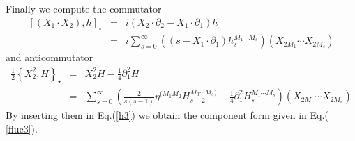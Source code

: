\documentclass[a4paper,12pt]{article}
\begin{document}
Finally we compute the commutator 
\begin{eqnarray}
\left[ \left( X_{1}\cdot X_{2}\right) ,h\right] _{\star } &=&i\left(
X_{2}\cdot \partial _{2}-X_{1}\cdot \partial _{1}\right) h \\
&=&i\sum_{s=0}^{\infty }\left( \left( s-X_{1}\cdot \partial _{1}\right)
h_{s}^{M_{1}\cdots M_{s}}\right) \left( X_{2M_{1}}\cdots X_{2M_{s}}\right)
\end{eqnarray}
and anticommutator 
\begin{eqnarray}
\frac{1}{2}\left\{ X_{2}^{2},H\right\} _{\star } &=&X_{2}^{2}H-\frac{1}{4}%
\partial _{1}^{2}H \\
&=&\sum_{s=0}^{\infty }\left( \frac{2}{s\left( s-1\right) }\eta
^{(M_{1}M_{2}}H_{s-2}^{M_{3}\cdots M_{s})}-\frac{1}{4}\partial
_{1}^{2}H_{s}^{M_{1}\cdots M_{s}}\right) \left( X_{2M_{1}}\cdots
X_{2M_{s}}\right)
\end{eqnarray}
By inserting them in Eq.(\ref{h3}) we obtain the component form given in Eq.(%
\ref{fluc3}).
\end{document}
